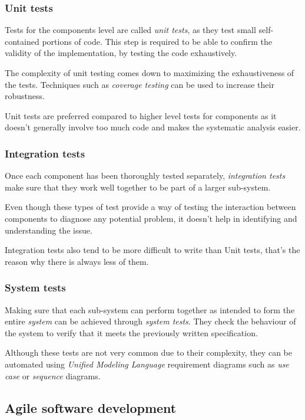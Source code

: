 \subsubsection{Unit tests}

Tests for the components level are called \textit{unit tests}, as they test small self-contained portions of code. This step is required to be able to confirm the validity of the implementation, by testing the code exhaustively\cite{27763}.

The complexity of unit testing comes down to maximizing the exhaustiveness of the tests. Techniques such as \textit{coverage testing} can be used to increase their robustness.

Unit tests are preferred compared to higher level tests for components as it doesn't generally involve too much code and makes the systematic analysis easier\cite{76037}.

\subsubsection{Integration tests}

Once each component has been thoroughly tested separately, \textit{integration tests} make sure that they work well together to be part of a larger sub-system.

Even though these types of test provide a way of testing the interaction between components to diagnose any potential problem, it doesn't help in identifying and understanding the issue\cite{7100358}.

Integration tests also tend to be more difficult to write than Unit tests, that's the reason why there is always less of them.

\subsubsection{System tests}

Making sure that each sub-system can perform together as intended to form the entire \textit{system} can be achieved through \textit{system tests}. They check the behaviour of the system to verify that it meets the previously written specification.

Although these tests are not very common due to their complexity, they can be automated using \textit{Unified Modeling Language} requirement diagrams such as \textit{use case} or \textit{sequence} diagrams\cite{hartmann_uml-based_2005}.

\subsection{Agile software development}
   
